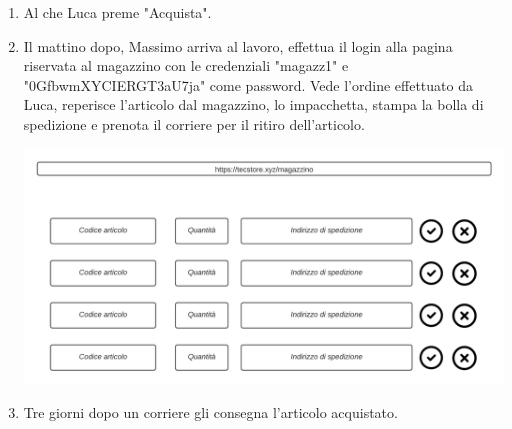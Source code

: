 \documentclass[12pt,a4paper]{article}
\begin{document}
\begin{enumerate}
\item Al che Luca preme "Acquista".

\item Il mattino dopo, Massimo arriva al lavoro, effettua il login alla pagina riservata al magazzino con le credenziali "magazz1" e "0GfbwmXYCIERGT3aU7ja" come password. Vede l'ordine effettuato da Luca, reperisce l'articolo dal magazzino, lo impacchetta, stampa la bolla di spedizione e prenota il corriere per il ritiro dell'articolo.

\includegraphics[width=\textwidth]{magazzino}

\item Tre giorni dopo un corriere gli consegna l'articolo acquistato.
\end{enumerate}

\newpage
\end{document}
